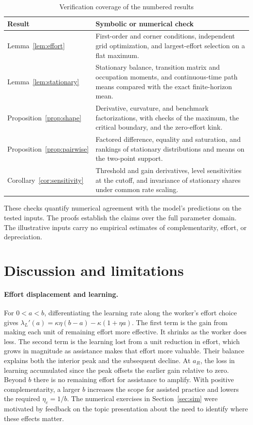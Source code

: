 \documentclass[11pt]{article}
\theoremstyle{definition}
\newcommand{\lam}{\lambda_L}
\begin{document}
\begin{table}[htbp]
\centering
\caption{Verification coverage of the numbered results}
\label{tab:verification}
\begin{tabular}{@{}p{.20\linewidth}p{.75\linewidth}@{}}
\toprule
Result & Symbolic or numerical check \\
\midrule
Lemma~\ref{lem:effort} &
First-order and corner conditions, independent grid optimization, and
largest-effort selection on a flat maximum. \\
Lemma~\ref{lem:stationary} &
Stationary balance, transition matrix and occupation moments, and
continuous-time path means compared with the exact finite-horizon mean. \\
Proposition~\ref{prop:shape} &
Derivative, curvature, and benchmark factorizations, with checks of
the maximum, the critical boundary, and the zero-effort kink. \\
Proposition~\ref{prop:pairwise} &
Factored difference, equality and saturation, and rankings of
stationary distributions and means on the two-point support. \\
Corollary~\ref{cor:sensitivity} &
Threshold and gain derivatives, level sensitivities at the cutoff, and
invariance of stationary shares under common rate scaling. \\
\bottomrule
\end{tabular}
\end{table}

These checks quantify numerical agreement with the model's predictions on
the tested inputs. The proofs establish the claims over the full parameter
domain. The illustrative inputs carry no empirical estimates of
complementarity, effort, or depreciation.

\section{Discussion and limitations}\label{sec:discussion}
\paragraph{Effort displacement and learning.}
For $0<a<b$, differentiating the learning rate along the worker's effort
choice gives $\lam'(a)=\kappa\eta(b-a)-\kappa(1+\eta a)$. The first term is
the gain from making each unit of remaining effort more effective.
It shrinks as the worker does less. The second term is the learning
lost from a unit reduction in effort, which grows in magnitude as
assistance makes that effort more valuable. Their balance explains both
the interior peak and the subsequent decline. At $a_R$, the loss in
learning accumulated since the peak offsets the earlier gain relative
to zero. Beyond $b$ there is no remaining effort for assistance to amplify.
With positive complementarity, a larger $b$ increases the scope for
assisted practice and lowers the required $\eta_c=1/b$. The numerical
exercises in Section~\ref{sec:sim} were motivated by feedback on the topic
presentation about the need to identify where these effects matter.
\end{document}

